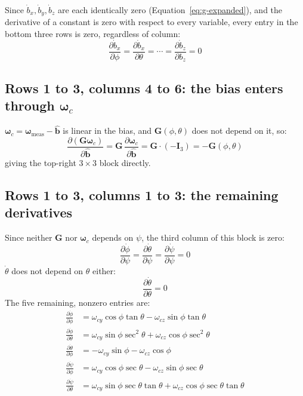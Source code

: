 \documentclass[12pt,a4paper]{article}
\newcommand{\bG}{\bm{G}}
\newcommand{\bI}{\bm{I}}
\newcommand{\bomega}{\bm{\omega}}
\begin{document}
{Since $\dot{b}_x, \dot{b}_y, \dot{b}_z$ are each identically zero
(Equation~\eqref{eq:g-expanded}), and the derivative of a constant is
zero with respect to every variable, every entry in the bottom three
rows is zero, regardless of column:
\begin{equation}
  \frac{\partial \dot{b}_x}{\partial \phi} = \frac{\partial \dot{b}_x}{\partial \theta} = \cdots = \frac{\partial \dot{b}_z}{\partial b_z} = 0
\end{equation}

\subsection{Rows 1 to 3, columns 4 to 6: the bias enters through \texorpdfstring{$\bomega_c$}{wc}}

$\bomega_c = \bomega_{\text{meas}} - \hat{\bm{b}}$ is linear in the bias,
and $\bG(\phi,\theta)$ does not depend on it, so:
\begin{equation}
  \frac{\partial(\bG\bomega_c)}{\partial \hat{\bm{b}}}
  = \bG\,\frac{\partial \bomega_c}{\partial \hat{\bm{b}}}
  = \bG \cdot (-\bI_3) = -\bG(\phi,\theta)
\end{equation}
giving the top-right $3\times 3$ block directly.

\subsection{Rows 1 to 3, columns 1 to 3: the remaining derivatives}

Since neither $\bG$ nor $\bomega_c$ depends on $\psi$, the third column
of this block is zero:
\begin{equation}
  \frac{\partial \dot\phi}{\partial \psi} = \frac{\partial \dot\theta}{\partial \psi} = \frac{\partial \dot\psi}{\partial \psi} = 0
\end{equation}
$\dot\theta$ does not depend on $\theta$ either:
\begin{equation}
  \frac{\partial \dot\theta}{\partial \theta} = 0
\end{equation}
The five remaining, nonzero entries are:
\begin{align}
  \frac{\partial \dot\phi}{\partial \phi} &=
    \omega_{cy}\cos\phi\tan\theta - \omega_{cz}\sin\phi\tan\theta \\
  \frac{\partial \dot\phi}{\partial \theta} &=
    \omega_{cy}\sin\phi\sec^2\theta + \omega_{cz}\cos\phi\sec^2\theta \\
  \frac{\partial \dot\theta}{\partial \phi} &=
    -\omega_{cy}\sin\phi - \omega_{cz}\cos\phi \\
  \frac{\partial \dot\psi}{\partial \phi} &=
    \omega_{cy}\cos\phi\sec\theta - \omega_{cz}\sin\phi\sec\theta \\
  \frac{\partial \dot\psi}{\partial \theta} &=
    \omega_{cy}\sin\phi\sec\theta\tan\theta + \omega_{cz}\cos\phi\sec\theta\tan\theta
\end{align}

}
\end{document}
